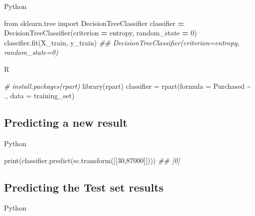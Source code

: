 \documentclass[
]{book}
\newenvironment{Shaded}{\begin{snugshade}}{\end{snugshade}}
\newcommand{\AttributeTok}[1]{\textcolor[rgb]{0.77,0.63,0.00}{#1}}
\newcommand{\BuiltInTok}[1]{#1}
\newcommand{\CommentTok}[1]{\textcolor[rgb]{0.56,0.35,0.01}{\textit{#1}}}
\newcommand{\DecValTok}[1]{\textcolor[rgb]{0.00,0.00,0.81}{#1}}
\newcommand{\FunctionTok}[1]{\textcolor[rgb]{0.00,0.00,0.00}{#1}}
\newcommand{\ImportTok}[1]{#1}
\newcommand{\NormalTok}[1]{#1}
\newcommand{\OperatorTok}[1]{\textcolor[rgb]{0.81,0.36,0.00}{\textbf{#1}}}
\newcommand{\OtherTok}[1]{\textcolor[rgb]{0.56,0.35,0.01}{#1}}
\newcommand{\SpecialCharTok}[1]{\textcolor[rgb]{0.00,0.00,0.00}{#1}}
\newcommand{\StringTok}[1]{\textcolor[rgb]{0.31,0.60,0.02}{#1}}
\theoremstyle{definition}
\theoremstyle{definition}
\theoremstyle{definition}
\theoremstyle{definition}
\theoremstyle{remark}
\begin{document}
Python

\begin{Shaded}
\begin{Highlighting}[]
\ImportTok{from}\NormalTok{ sklearn.tree }\ImportTok{import}\NormalTok{ DecisionTreeClassifier}
\NormalTok{classifier }\OperatorTok{=}\NormalTok{ DecisionTreeClassifier(criterion }\OperatorTok{=} \StringTok{\textquotesingle{}entropy\textquotesingle{}}\NormalTok{, random\_state }\OperatorTok{=} \DecValTok{0}\NormalTok{)}
\NormalTok{classifier.fit(X\_train, y\_train)}
\CommentTok{\#\# DecisionTreeClassifier(criterion=\textquotesingle{}entropy\textquotesingle{}, random\_state=0)}
\end{Highlighting}
\end{Shaded}

R

\begin{Shaded}
\begin{Highlighting}[]
\CommentTok{\# install.packages(\textquotesingle{}rpart\textquotesingle{})}
\FunctionTok{library}\NormalTok{(rpart)}
\NormalTok{classifier }\OtherTok{=} \FunctionTok{rpart}\NormalTok{(}\AttributeTok{formula =}\NormalTok{ Purchased }\SpecialCharTok{\textasciitilde{}}\NormalTok{ .,}
                   \AttributeTok{data =}\NormalTok{ training\_set)}
\end{Highlighting}
\end{Shaded}

\hypertarget{predicting-a-new-result-8}{%
\subsection{Predicting a new result}\label{predicting-a-new-result-8}}

Python

\begin{Shaded}
\begin{Highlighting}[]
\BuiltInTok{print}\NormalTok{(classifier.predict(sc.transform([[}\DecValTok{30}\NormalTok{,}\DecValTok{87000}\NormalTok{]])))}
\CommentTok{\#\# [0]}
\end{Highlighting}
\end{Shaded}

\hypertarget{predicting-the-test-set-results-7}{%
\subsection{Predicting the Test set results}\label{predicting-the-test-set-results-7}}

Python
\end{document}
